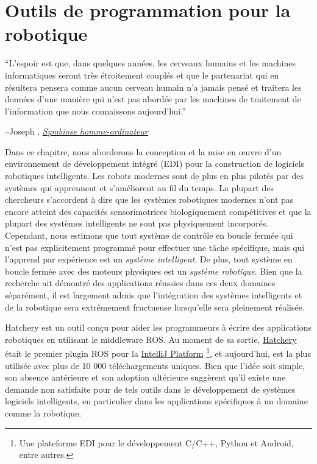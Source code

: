 \chapter{Outils de programmation pour la robotique}\label{ch:hatchery}
\setlength{\epigraphwidth}{0.78\textwidth}
\epigraph{``L'espoir est que, dans quelques années, les cerveaux humains et les machines informatiques seront très étroitement couplés et que le partenariat qui en résultera pensera comme aucun cerveau humain n'a jamais pensé et traitera les données d'une manière qui n'est pas abordée par les machines de traitement de l'information que nous connaissons aujourd'hui.''}{\begin{flushright}--Joseph \citet{licklider1960man}, \href{https://groups.csail.mit.edu/medg/people/psz/Licklider.html}{\textit{Symbiose homme-ordinateur}}\end{flushright}}

Dans ce chapitre, nous aborderons la conception et la mise en œuvre d'un environnement de développement intégré (EDI) pour la construction de logiciels robotiques intelligents. Les robots modernes sont de plus en plus pilotés par des systèmes qui apprennent et s'améliorent au fil du temps. La plupart des chercheurs s'accordent à dire que les systèmes robotiques modernes n'ont pas encore atteint des capacités sensorimotrices biologiquement compétitives et que la plupart des systèmes intelligents ne sont pas physiquement incorporés. Cependant, nous estimons que tout système de contrôle en boucle fermée qui n'est pas explicitement programmé pour effectuer une tâche spécifique, mais qui l'apprend par expérience est un \textit{système intelligent}. De plus, tout système en boucle fermée avec des moteurs physiques est un \textit{système robotique}. Bien que la recherche ait démontré des applications réussies dans ces deux domaines séparément, il est largement admis que l'intégration des systèmes intelligents et de la robotique sera extrêmement fructueuse lorsqu'elle sera pleinement réalisée.

Hatchery est un outil conçu pour aider les programmeurs à écrire des applications robotiques en utilisant le middleware ROS. Au moment de sa sortie, \href{https://github.com/duckietown/hatchery}{Hatchery} était le premier plugin ROS pour la \href{https://www.jetbrains.org/intellij/sdk/docs}{IntelliJ Platform} \footnote{Une plateforme EDI pour le développement C/C++, Python et Android, entre autres.}, et aujourd'hui, est la plus utilisée avec plus de 10 000 téléchargements uniques. Bien que l'idée soit simple, son absence antérieure et son adoption ultérieure suggèrent qu'il existe une demande non satisfaite pour de tels outils dans le développement de systèmes logiciels intelligents, en particulier dans les applications spécifiques à un domaine comme la robotique.
%

